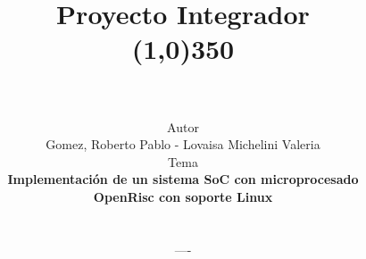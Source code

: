 \documentclass[a4paper,12pt]{report}
\begin{document}
\title{\vspace{-4cm} \textbf{Proyecto Integrador \\ \line(1,0){350}}\\
  \vspace{0.5cm}\\}
\author{\vspace{-0.25cm} Autor \vspace{0.25cm}\\ Gomez, Roberto Pablo - Lovaisa
Michelini Valeria \bigskip \bigskip \bigskip \\
  Tema \vspace{0.25cm} \\ \textbf{Implementación de un sistema SoC con microprocesado  }\\ \textbf{OpenRisc con soporte Linux} \\ \textbf{} \bigskip \bigskip \bigskip \bigskip\\
  \begin{normalsize}---- \bigskip \bigskip \end{normalsize}\\ }
\date{}
\end{document}
